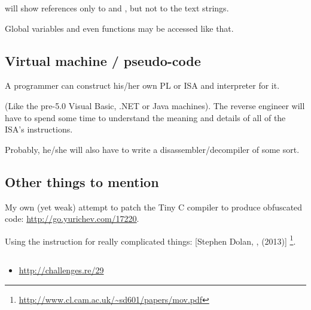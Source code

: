 \IDA{} will show references only to  and , 
but not to the text strings.

Global variables and even functions may be accessed like that.

\subsection{Virtual machine / pseudo-code}

A programmer can construct his/her own \ac{PL} or \ac{ISA} and interpreter for it.

(Like the pre-5.0 Visual Basic, .NET or Java machines).
The reverse engineer will have to spend some time to understand the meaning 
and details of all of the \ac{ISA}'s instructions.

Probably, he/she will also have to write a disassembler/decompiler of some sort.

\subsection{Other things to mention}

My own (yet weak) attempt to patch the Tiny C compiler to produce obfuscated code: \url{http://go.yurichev.com/17220}.

Using the \MOV 
instruction for really complicated things: 
[Stephen Dolan, , (2013)]
\footnote{\AlsoAvailableAs \url{http://www.cl.cam.ac.uk/~sd601/papers/mov.pdf}}. 

\subsection{\Exercise}

\begin{itemize}
	\item \url{http://challenges.re/29}
\end{itemize}


